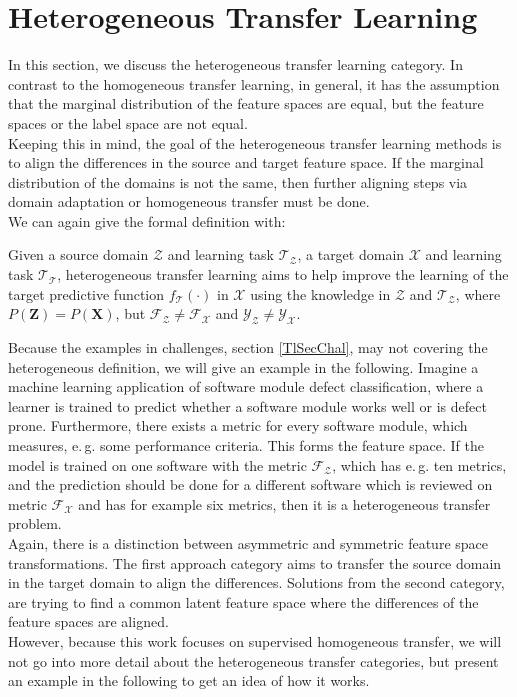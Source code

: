 \section{Heterogeneous Transfer Learning}\label{TlSecHetero}
In this section, we discuss the heterogeneous transfer learning category.
In contrast to the homogeneous transfer learning, in general, it has the assumption that the marginal distribution of the feature spaces are equal, but the feature spaces or the label space are not equal.\cite[p. 4]{Weiss.2016}\\
Keeping this in mind, the goal of the heterogeneous transfer learning methods is to align the differences in the source and target feature space.
If the marginal distribution of the domains is not the same, then further aligning steps via domain adaptation or homogeneous transfer must be done.
\cite[p. 6]{Weiss.2016}\\
We can again give the formal definition with:
\begin{mDef}
	Given a source domain $\mathcal{Z}$ and learning task $\mathcal{T_Z}$, a target domain $\mathcal{X}$ and learning task $\mathcal{T_T}$, heterogeneous transfer learning aims to help improve the learning of the target predictive function $f_\mathcal{T}(\cdot)$ in $\mathcal{X}$ using the knowledge in $\mathcal{Z}$ and $\mathcal{T_Z}$, where $P(\mathbf{Z}) = P(\mathbf{X})$, but $\mathcal{F_Z} \neq \mathcal{F_X}$ and $\mathcal{Y_Z} \neq \mathcal{Y_X} $.\cite[p. 4]{Weiss.2016}
\end{mDef}
Because the examples in challenges, section \ref{TlSecChal}, may not covering the heterogeneous definition, we will give an example in the following.
Imagine a machine learning application of software module defect classification, where a learner is trained to predict whether a software module works well or is defect prone.
Furthermore, there exists a metric for every software module, which measures, e.\,g. some performance criteria.
This forms the feature space.
If the model is trained on one software with the metric $\mathcal{F_Z}$, which has e.\,g. ten metrics, and the prediction should be done for a different software which is reviewed on metric $\mathcal{F_X}$ and has for example six metrics, then it is a heterogeneous transfer problem.\cite[p 3-4]{Weiss.2016}\\
Again, there is a distinction between asymmetric and symmetric feature space transformations.
The first approach category aims to transfer the source domain in the target domain to align the differences.
Solutions from the second category, are trying to find a common latent feature space where the differences of the feature spaces are aligned.\cite[p. 19]{Weiss.2016}\\
However, because this work focuses on supervised homogeneous transfer, we will not go into more detail about the heterogeneous transfer categories, but present an example in the following to get an idea of how it works.\\
